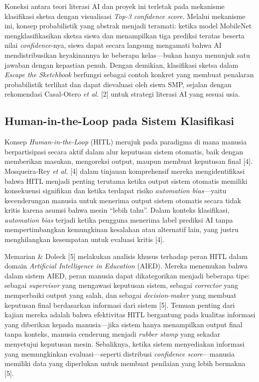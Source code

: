 Koneksi antara teori literasi AI dan proyek ini terletak pada mekanisme klasifikasi sketsa dengan visualisasi \textit{Top-3 confidence score}. Melalui mekanisme ini, konsep probabilistik yang abstrak menjadi teramati: ketika model MobileNet mengklasifikasikan sketsa siswa dan menampilkan tiga prediksi teratas beserta nilai \textit{confidence}-nya, siswa dapat secara langsung mengamati bahwa AI mendistribusikan keyakinannya ke beberapa kelas—bukan hanya menunjuk satu jawaban dengan kepastian penuh. Dengan demikian, klasifikasi sketsa dalam \textit{Escape the Sketchbook} berfungsi sebagai contoh konkret yang membuat penalaran probabilistik terlihat dan dapat dievaluasi oleh siswa SMP, sejalan dengan rekomendasi Casal-Otero \textit{et al.} [2] untuk strategi literasi AI yang sesuai usia.

\subsection{Human-in-the-Loop pada Sistem Klasifikasi}
\label{subsec:hitl-klasifikasi}

Konsep \textit{Human-in-the-Loop} (HITL) merujuk pada paradigma di mana manusia berpartisipasi secara aktif dalam alur keputusan sistem otomatis, baik dengan memberikan masukan, mengoreksi output, maupun membuat keputusan final [4]. Mosqueira-Rey \textit{et al.} [4] dalam tinjauan komprehensif mereka mengidentifikasi bahwa HITL menjadi penting terutama ketika output sistem otomatis memiliki konsekuensi signifikan dan ketika terdapat risiko \textit{automation bias}—yaitu kecenderungan manusia untuk menerima output sistem otomatis secara tidak kritis karena asumsi bahwa mesin ``lebih tahu''. Dalam konteks klasifikasi, \textit{automation bias} terjadi ketika pengguna menerima label prediksi AI tanpa mempertimbangkan kemungkinan kesalahan atau alternatif lain, yang justru menghilangkan kesempatan untuk evaluasi kritis [4].

Memarian \& Doleck [5] melakukan analisis khusus terhadap peran HITL dalam domain \textit{Artificial Intelligence in Education} (AIED). Mereka menemukan bahwa dalam sistem AIED, peran manusia dapat dikategorikan menjadi beberapa tipe: sebagai \textit{supervisor} yang mengawasi keputusan sistem, sebagai \textit{corrector} yang memperbaiki output yang salah, dan sebagai \textit{decision-maker} yang membuat keputusan final berdasarkan informasi dari sistem [5]. Temuan penting dari kajian mereka adalah bahwa efektivitas HITL bergantung pada kualitas informasi yang diberikan kepada manusia—jika sistem hanya menampilkan output final tanpa konteks, manusia cenderung menjadi \textit{rubber stamp} yang sekadar menyetujui keputusan mesin. Sebaliknya, ketika sistem menyediakan informasi yang memungkinkan evaluasi—seperti distribusi \textit{confidence score}—manusia memiliki data yang diperlukan untuk membuat penilaian yang lebih bermakna [5].

